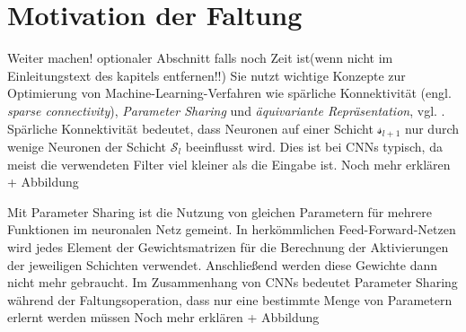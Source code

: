 


\section{Motivation der Faltung}
Weiter machen! optionaler Abschnitt falls noch Zeit ist(wenn nicht im Einleitungstext des kapitels entfernen!!)
Sie nutzt wichtige Konzepte zur Optimierung von Machine-Learning-Verfahren wie spärliche Konnektivität (engl. \textit{sparse connectivity}), \textit{Parameter Sharing} und \textit{äquivariante Repräsentation}, vgl. \cite{goodfellow}. Spärliche Konnektivität bedeutet, dass Neuronen auf einer Schicht $\mathcal{s}_{l+1}$ nur durch wenige Neuronen der Schicht $\mathcal{S}_l$ beeinflusst wird. Dies ist bei CNNs typisch, da meist die verwendeten Filter viel kleiner als die Eingabe ist. Noch mehr erklären + Abbildung

Mit Parameter Sharing ist die Nutzung von gleichen Parametern für mehrere Funktionen im neuronalen Netz gemeint. In herkömmlichen Feed-Forward-Netzen wird jedes Element der Gewichtsmatrizen für die Berechnung der Aktivierungen der jeweiligen Schichten verwendet. Anschließend werden diese Gewichte dann nicht mehr gebraucht. Im Zusammenhang von CNNs bedeutet Parameter Sharing während der Faltungsoperation, dass nur eine bestimmte Menge von Parametern erlernt werden müssen
Noch mehr erklären + Abbildung


